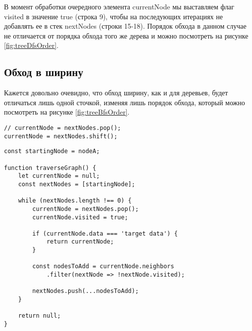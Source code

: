 \documentclass[../article.tex]{subfiles}
\begin{document}
В момент обработки очередного элемента {\firacodebold currentNode} мы выставляем флаг {\firacodebold visited} в значение {\firacodebold true} (строка 9), чтобы на последующих итерациях не добавлять ее в стек {\firacodebold nextNodes} (строки 15-18). Порядок обхода в данном случае не отличается от порядка обхода того же дерева и можно посмотреть на рисунке \ref{fig:treeDfsOrder}.

\subsection{Обход в ширину}

Кажется довольно очевидно, что обход ширину, как и для деревьев, будет отличаться лишь одной сточкой, изменяя лишь порядок обхода, который можно посмотреть на рисунке \ref{fig:treeBfsOrder}.

\begin{ruledelement}
    \begin{lstlisting}[caption={Отличие обхода в ширину от обхода в глубину}, label={lst:graphBfsDiff}]
// currentNode = nextNodes.pop();
currentNode = nextNodes.shift();
    \end{lstlisting}
\end{ruledelement}

\twocolumnbagebreak

\begin{strip}
    \begin{ruledelement}
        \begin{lstlisting}[caption={Обход графа в глубину}, label={lst:graphDfs}]
const startingNode = nodeA;

function traverseGraph() {
    let currentNode = null;
    const nextNodes = [startingNode];

    while (nextNodes.length !== 0) {
        currentNode = nextNodes.pop();
        currentNode.visited = true;

        if (currentNode.data === 'target data') {
            return currentNode;
        }

        const nodesToAdd = currentNode.neighbors
            .filter(nextNode => !nextNode.visited);

        nextNodes.push(...nodesToAdd);
    }

    return null;
}

        \end{lstlisting}
    \end{ruledelement}
\end{strip}

\lipsum[1]
\end{document}
